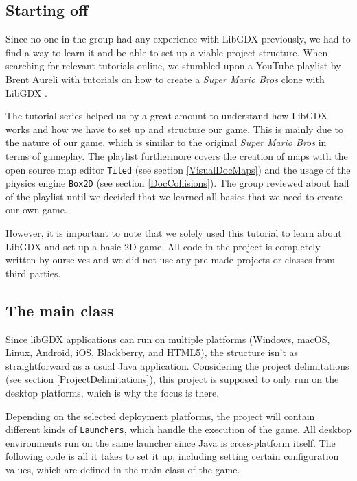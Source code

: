 \documentclass[12p]{article}
\begin{document}

\newpage
\subsection{Starting off}

Since no one in the group had any experience with LibGDX previously, we had to find a way to learn it and be able to set up a viable project structure. When searching for relevant tutorials online, we stumbled upon a YouTube playlist by Brent Aureli with tutorials on how to create a \emph{Super Mario Bros} \cite{SuperMarioBros} clone with LibGDX \cite{BrentAureliSuperMarioBros}.

The tutorial series helped us by a great amount to understand how LibGDX works and how we have to set up and structure our game. This is mainly due to the nature of our game, which is similar to the original \emph{Super Mario Bros} in terms of gameplay. The playlist furthermore covers the creation of maps with the open source map editor \texttt{Tiled} (see section \ref{VisualDocMaps}) and the usage of the physics engine \texttt{Box2D} (see section \ref{DocCollisions}). The group reviewed about half of the playlist until we decided that we learned all basics that we need to create our own game.

However, it is important to note that we solely used this tutorial to learn about LibGDX and set up a basic 2D game. All code in the project is completely written by ourselves and we did not use any pre-made projects or classes from third parties.


\newpage
\subsection{The main class} \label{DocMainClass}

Since libGDX applications can run on multiple platforms (Windows, macOS, Linux, Android, iOS, Blackberry, and HTML5), the structure isn't as straightforward as a usual Java application. Considering the project delimitations (see section \ref{ProjectDelimitations}), this project is supposed to only run on the desktop platforms, which is why the focus is there.

Depending on the selected deployment platforms, the project will contain different kinds of \texttt{Launchers}, which handle the execution of the game. All desktop environments run on the same launcher since Java is cross-platform itself. The following code is all it takes to set it up, including setting certain configuration values, which are defined in the main class of the game.
\end{document}
